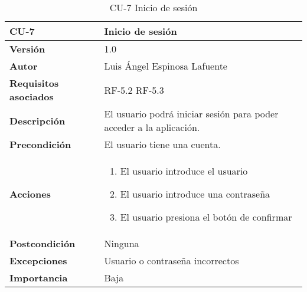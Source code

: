 \begin{table}[p]
	\centering
	\begin{tabularx}{\linewidth}{ p{} p{} }
		\toprule
		\textbf{CU-7}    & \textbf{Inicio de sesión}\\
		\toprule
		\textbf{Versión}              & 1.0    \\
		\textbf{Autor}                &  Luis Ángel Espinosa Lafuente \\
		\textbf{Requisitos asociados} & RF-5.2 RF-5.3\\
		\textbf{Descripción}          & El usuario podrá iniciar sesión para poder acceder a la aplicación.\\
		\textbf{Precondición}         & El usuario tiene una cuenta.\\
		\textbf{Acciones}             &
		\begin{enumerate}
			\def\labelenumi{\arabic{enumi}.}
			\tightlist
			\item El usuario introduce el usuario
			\item El usuario introduce una contraseña
			\item El usuario presiona el botón de confirmar
		\end{enumerate}\\
		\textbf{Postcondición}        & Ninguna \\
		\textbf{Excepciones}          & Usuario o contraseña incorrectos \\
		\textbf{Importancia}          & Baja \\
		\bottomrule
	\end{tabularx}
	\caption{CU-7 Inicio de sesión}
\end{table}

